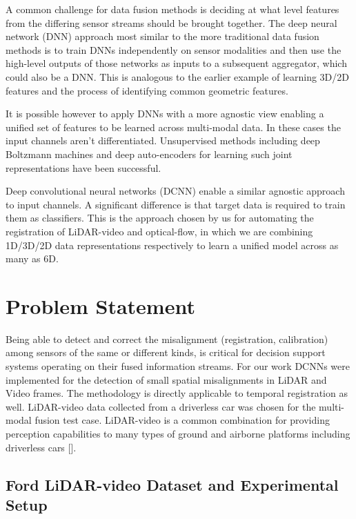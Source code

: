 \documentclass{article}
\begin{document}
A common challenge for data fusion methods is deciding at what level features from the differing sensor streams should be brought together. The deep neural network (DNN) approach most similar to the more traditional data fusion methods is to train DNNs independently on sensor modalities and then use the high-level outputs of those networks as inputs to a subsequent aggregator, which could also be a DNN. This is analogous to the earlier example of learning 3D/2D features and the process of identifying common geometric features. 

It is possible however to apply DNNs with a more agnostic view enabling a unified set of features to be learned across multi-modal data. In these cases the input channels aren't differentiated. Unsupervised methods including deep Boltzmann machines and deep auto-encoders for learning such joint representations have been successful.  

Deep convolutional neural networks (DCNN) enable a similar agnostic approach to input channels. A significant difference is that target data is required to train them as classifiers. This is the approach chosen by us for automating the registration of LiDAR-video and optical-flow, in which we are combining 1D/3D/2D data representations respectively to learn a unified model across as many as 6D. 




\section{Problem Statement} %
\label{sec:problem_statement}

Being able to detect and correct the misalignment (registration, calibration) among sensors of the same or different kinds, is critical for decision support systems operating on their fused information streams. For our work DCNNs were implemented for the detection of small spatial misalignments in LiDAR and Video frames. The methodology is directly applicable to temporal registration as well. LiDAR-video data collected from a driverless car was chosen for the multi-modal fusion test case. LiDAR-video is a common combination for providing perception capabilities to many types of ground and airborne platforms including driverless cars [\cite{Thrun2011Googles-dr}]. 

\subsection{Ford LiDAR-video Dataset and Experimental Setup} %
\label{sub:ford_lidar_video_dataset_and_experimental_setup}
\end{document}
